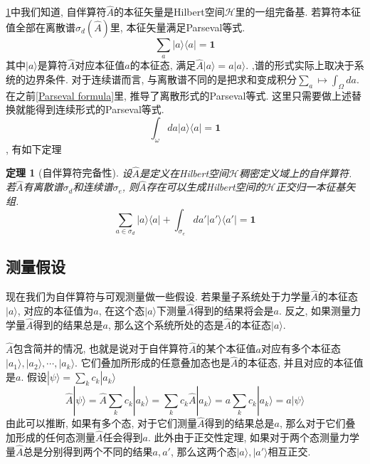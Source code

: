 \documentclass[a4paper,11pt]{book}
\newtheorem{theorem}{\hspace{2em}定理}[section]
\begin{document}
\ref{self-adjoint operator complete}中我们知道, 自伴算符$\hat{A}$的本征矢量是Hilbert空间$\mathcal{H}$里的一组完备基. 若算符本征值全部在离散谱$\sigma_d(\hat{A})$里, 本征矢量满足Parseval等式.
\begin{equation*}
  \sum_{a}|a\rangle\langle a|=\mathbf{1}
\end{equation*}
其中$|a\rangle$是算符$\hat{A}$对应本征值$a$的本征态, 满足$\hat{A}|a\rangle=a|a\rangle$.
,谱的形式实际上取决于系统的边界条件. 对于连续谱而言, 与离散谱不同的是把求和变成积分$\sum_{a}\mapsto\int_{\Omega}da$. 在之前\eqref{Parseval formula}里, 推导了离散形式的Parseval等式. 这里只需要做上述替换就能得到连续形式的Parseval等式.
\begin{equation*}
  \int_{\omega}da|a\rangle\langle a|=\mathbf{1}
\end{equation*}
, 有如下定理
\begin{theorem}[自伴算符完备性]\label{self-adjoint operator complete}
  设$\hat{A}$是定义在Hilbert空间$\mathcal{H}$稠密定义域上的自伴算符. 若$\hat{A}$有离散谱$\sigma_d$和连续谱$\sigma_e$, 则$\hat{A}$存在可以生成Hilbert空间的$\mathcal{H}$正交归一本征基矢组.
\begin{equation*}
  \sum_{a\in\sigma_d}|a\rangle\langle a|+\int_{\sigma_e}da'|a'\rangle\langle a'|=\mathbf{1}
\end{equation*}
\end{theorem}
\subsection{测量假设}\label{section measure}
现在我们为自伴算符与可观测量做一些假设. 若果量子系统处于力学量$\hat{A}$的本征态$|a\rangle$, 对应的本征值为$a$, 在这个态$|a\rangle$下测量$\hat{A}$得到的结果将会是$a$. 反之, 如果测量力学量$\hat{A}$得到的结果总是$a$, 那么这个系统所处的态是$\hat{A}$的本征态$|a\rangle$.

$\hat{A}$包含简并的情况, 也就是说对于自伴算符$\hat{A}$的某个本征值$a$对应有多个本征态$|a_1\rangle,|a_2\rangle,\cdots,|a_k\rangle$. 它们叠加所形成的任意叠加态也是$\hat{A}$的本征态, 并且对应的本征值是$a$. 假设$|\psi\rangle=\sum_{k}c_k|a_k\rangle$
\begin{equation*}
  \hat{A}|\psi\rangle=\hat{A}\sum_{k}c_k|a_k\rangle=\sum_{k}c_k\hat{A}|a_k\rangle=a\sum_{k}c_k|a_k\rangle=a|\psi\rangle
\end{equation*}
由此可以推断, 如果有多个态, 对于它们测量$\hat{A}$得到的结果总是$a$, 那么对于它们叠加形成的任何态测量$\hat{A}$任会得到$a$. 此外由于正交性定理, 如果对于两个态测量力学量$\hat{A}$总是分别得到两个不同的结果$a,a'$, 那么这两个态$|a\rangle,|a'\rangle$相互正交.
\end{document}
